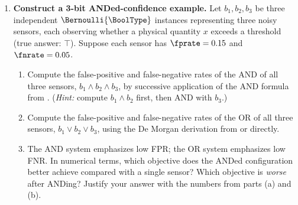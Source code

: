 \begin{enumerate}
\item \exstarstar
\textbf{Construct a 3-bit ANDed-confidence example.}
Let $b_1, b_2, b_3$ be three independent $\Bernoulli{\BoolType}$ instances
representing three noisy sensors, each observing whether a physical quantity
$x$ exceeds a threshold (true answer: $\top$). Suppose each sensor has
$\fprate = 0.15$ and $\fnrate = 0.05$.
\begin{enumerate}
  \item[(a)] Compute the false-positive and false-negative rates of the
    AND of all three sensors, $b_1 \wedge b_2 \wedge b_3$, by successive
    application of the AND formula from .
    (\textit{Hint:} compute $b_1 \wedge b_2$ first, then AND with $b_3$.)
  \item[(b)] Compute the false-positive and false-negative rates of the
    OR of all three sensors, $b_1 \vee b_2 \vee b_3$, using the De Morgan
    derivation from  or directly.
  \item[(c)] The AND system emphasizes low FPR; the OR system emphasizes
    low FNR. In numerical terms, which objective does the ANDed configuration
    better achieve compared with a single sensor? Which objective is
    \emph{worse} after ANDing? Justify your answer with the numbers from
    parts (a) and (b).
\end{enumerate}



\end{enumerate}
